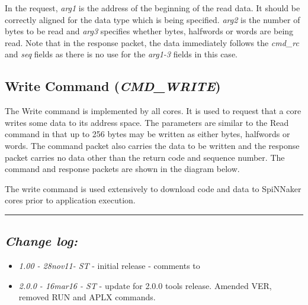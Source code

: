 
In the request, {\em arg1} is the address of the beginning of the read
data. It should be correctly aligned for the data type which is being
specified. {\em arg2} is the number of bytes to be read and {\em arg3}
specifies whether bytes, halfwords or words are being read. Note that
in the response packet, the data immediately follows the {\em cmd\_rc}
and {\em seq} fields as there is no use for the {\em arg1-3} fields in
this case.

\subsection{Write Command ({\em CMD\_WRITE})}

The Write command is implemented by all cores. It is used to request
that a core writes some data to its address space. The parameters are
similar to the Read command in that up to 256 bytes may be written as
either bytes, halfwords or words. The command packet also carries the
data to be written and the response packet carries no data other than
the return code and sequence number. The command and response packets
are shown in the diagram below.


The write command is used extensively to download code and data to
SpiNNaker cores prior to application execution.

\rule{\linewidth}{1pt}

\subsection{\itshape Change log:}

\begin{itemize}
\item {\itshape 1.00 - 28nov11- ST} - initial release - comments to
  {\itshape \Email}
\item {\itshape 2.0.0 - 16mar16 - ST} - update for 2.0.0 tools release.
Amended VER, removed RUN and APLX commands.
\end{itemize}


